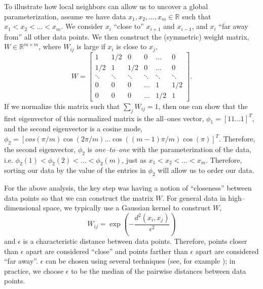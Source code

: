 \documentclass[11pt]{article}
\begin{document}
To illustrate how local neighbors can allow us to uncover a global parameterization, assume we have data $x_1, x_2, \dots, x_m \in \mathbb{R}$ such that $x_1 < x_2 < \dots < x_m$.
%
We consider $x_i$ ``close to'' $x_{i+1}$ and $x_{i-1}$, and $x_i$ ``far away from'' all other data points. 
%
We then construct the (symmetric) weight matrix, $W \in \mathbb{R}^{m \times m}$, where $W_{ij}$ is large if $x_i$ is close to $x_j$,
\begin{equation}
W = 
\begin{bmatrix}
	1 & 1/2 & 0 & 0 & \dots & 0 \\
	1/2 & 1 & 1/2 & 0 & \dots & 0 \\
	\ddots & \ddots & \ddots & \ddots & \ddots & \ddots \\
	0 & 0 & 0 & \dots & 1 & 1/2 \\
	0 & 0 & 0 & \dots & 1/2 & 1 
\end{bmatrix}.
\end{equation}
%
If we normalize this matrix such that $\sum_j W_{ij} = 1$, then one can show that the first eigenvector of this normalized matrix is the all--ones vector, $\phi_1 = [1 1 \dots 1]^T$, and the second eigenvector is a cosine mode, $\phi_2 = [cos(\pi/m) \cos(2 \pi/ m) \dots \cos((m-1) \pi / m) \cos(\pi)]^T$.
%
Therefore, the second eigenvector, $\phi_2$ is {\em one--to--one} with the parameterization of the data, i.e. $\phi_2(1) < \phi_2(2) < \dots < \phi_2(m)$, just as $x_1 < x_2 < \dots < x_m$. 
%
Therefore, sorting our data by the value of the entries in $\phi_2$ will allow us to order our data.

For the above analysis, the key step was having a notion of ``closeness'' between data points so that we can construct the matrix $W$.
%
For general data in high--dimensional space, we typically use a Gaussian kernel to construct $W$,
\begin{equation} \label{eq:dmaps_W}
W_{ij} = \exp \left( -\frac{d^2(x_i, x_j)}{\epsilon^2} \right)
\end{equation}
and $\epsilon$ is a characteristic distance between data points.
%
Therefore, points closer than $\epsilon$ apart are considered ``close'' and points farther than $\epsilon$ apart are considered ``far away''.
%
$\epsilon$ can be chosen using several techniques (see, for example \cite{coifman2008graph}); in practice, we choose $\epsilon$ to be the median of the pairwise distances between data points.
\end{document}
